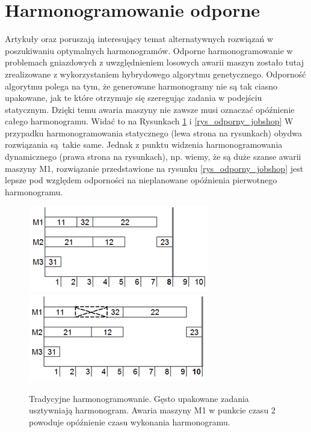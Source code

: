 \documentclass[archivemode]{mgr}
\begin{document}
\section{Harmonogramowanie odporne}
Artykuły \cite{RFJSRMB_ElMekkawy11} oraz \cite{RFJSRMB_Chen} poruszają interesujący temat alternatywnych rozwiązań w poszukiwaniu optymalnych harmonogramów. Odporne harmonogramowanie w problemach gniazdowych z uwzględnieniem losowych awarii maszyn \cite{RFJSRMB_ElMekkawy11} zostało tutaj zrealizowane z wykorzystaniem hybrydowego algorytmu genetycznego. Odporność algorytmu polega na tym, że generowane harmonogramy nie są tak ciasno upakowane, jak te które otrzymuje się szeregując zadania w podejściu statycznym. Dzięki temu awaria maszyny nie zawsze musi oznaczać opóźnienie całego harmonogramu. Widać to na Rysunkach \ref{rys_tradycyjny_jobshop} i \ref{rys_odporny_jobshop} W przypadku harmonogramowania statycznego (lewa strona na rysunkach) obydwa rozwiązania są~takie same. Jednak z punktu widzenia harmonogramowania dynamicznego (prawa strona na rysunkach), np. wiemy, że są duże szanse awarii maszyny M1, rozwiązanie przedstawione na rysunku \ref{rys_odporny_jobshop} jest lepsze pod względem odporności na nieplanowane opóźnienia pierwotnego harmonogramu.
\begin{figure}[!ht]
\begin{center}
\includegraphics[width=1.0\linewidth]{rysunki/tradycyjny_jobshopA.png}
\endminipage \hfill
{}%
\includegraphics[width=1.0\linewidth]{rysunki/tradycyjny_jobshopB.png}
\endminipage
\caption[Tradycyjne harmonogramowanie]{Tradycyjne harmonogramowanie. Gęsto upakowane zadania usztywniają harmonogram. Awaria maszyny M1 w punkcie czasu 2 powoduje opóźnienie czasu wykonania harmonogramu.}
\label{rys_tradycyjny_jobshop}
\end{center}
\end{figure}
\end{document}
